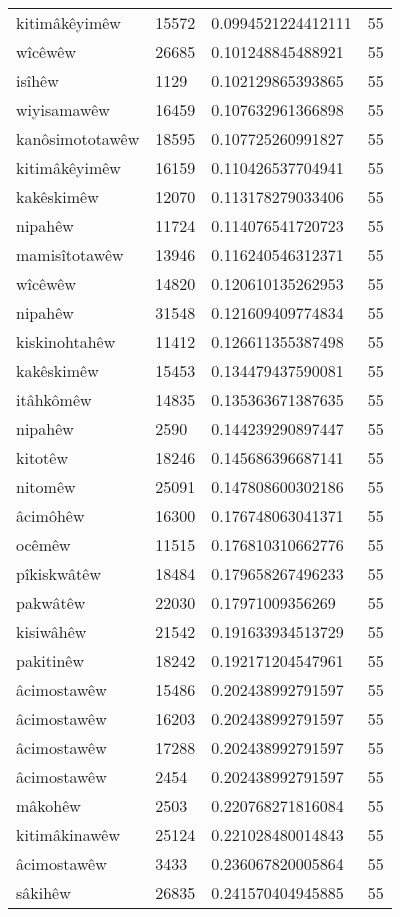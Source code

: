 \begin{longtable}{llll}
kitimâkêyimêw & 15572 & 0.0994521224412111 & 55\\
wîcêwêw & 26685 & 0.101248845488921 & 55\\
isîhêw & 1129 & 0.102129865393865 & 55\\
wiyisamawêw & 16459 & 0.107632961366898 & 55\\
kanôsimototawêw & 18595 & 0.107725260991827 & 55\\
kitimâkêyimêw & 16159 & 0.110426537704941 & 55\\
kakêskimêw & 12070 & 0.113178279033406 & 55\\
nipahêw & 11724 & 0.114076541720723 & 55\\
mamisîtotawêw & 13946 & 0.116240546312371 & 55\\
wîcêwêw & 14820 & 0.120610135262953 & 55\\
nipahêw & 31548 & 0.121609409774834 & 55\\
kiskinohtahêw & 11412 & 0.126611355387498 & 55\\
kakêskimêw & 15453 & 0.134479437590081 & 55\\
itâhkômêw & 14835 & 0.135363671387635 & 55\\
nipahêw & 2590 & 0.144239290897447 & 55\\
kitotêw & 18246 & 0.145686396687141 & 55\\
nitomêw & 25091 & 0.147808600302186 & 55\\
âcimôhêw & 16300 & 0.176748063041371 & 55\\
ocêmêw & 11515 & 0.176810310662776 & 55\\
pîkiskwâtêw & 18484 & 0.179658267496233 & 55\\
pakwâtêw & 22030 & 0.17971009356269 & 55\\
kisiwâhêw & 21542 & 0.191633934513729 & 55\\
pakitinêw & 18242 & 0.192171204547961 & 55\\
âcimostawêw & 15486 & 0.202438992791597 & 55\\
âcimostawêw & 16203 & 0.202438992791597 & 55\\
âcimostawêw & 17288 & 0.202438992791597 & 55\\
âcimostawêw & 2454 & 0.202438992791597 & 55\\
mâkohêw & 2503 & 0.220768271816084 & 55\\
kitimâkinawêw & 25124 & 0.221028480014843 & 55\\
âcimostawêw & 3433 & 0.236067820005864 & 55\\
sâkihêw & 26835 & 0.241570404945885 & 55\\

\end{longtable}

